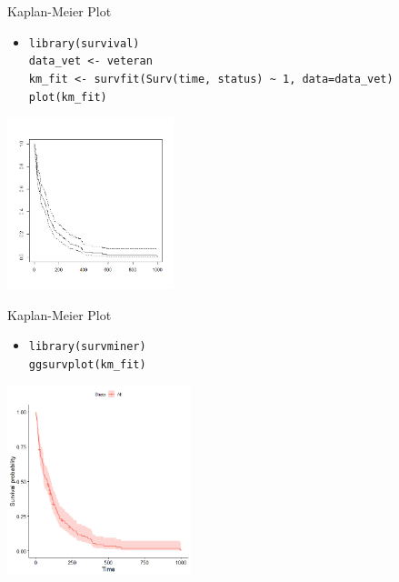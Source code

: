 \documentclass[aspectratio = 169]{chariteBeamer}
\begin{document}
\begin{frame}[fragile]{Kaplan-Meier Plot}
	\begin{itemize}
		\item \verb+library(survival)+ \\ \verb+data_vet <- veteran+ \\ \verb+km_fit <- survfit(Surv(time, status) ~ 1, data=data_vet)+ \\ \verb+plot(km_fit)+
	\end{itemize}
			
	\begin{center}
		\includegraphics[height=5cm]{KM1}
	\end{center}
\end{frame}

\begin{frame}[fragile]{Kaplan-Meier Plot}
	\begin{itemize}
		\item \verb+library(survminer)+ \\ \verb+ggsurvplot(km_fit)+
	\end{itemize}
			
	\begin{center}
		\includegraphics[height=5.5cm]{KM2}
	\end{center}
\end{frame}
\end{document}
